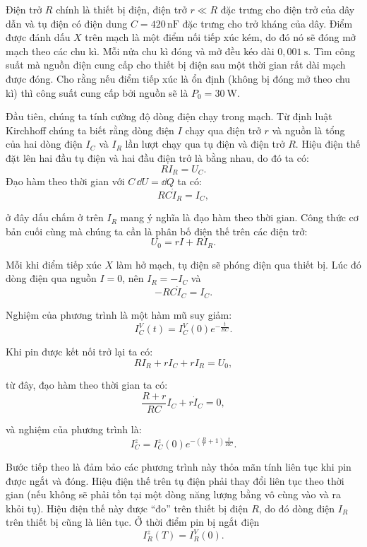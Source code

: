 \begin{vd}
\begin{center}
\begin{tikzpicture}[x=0.75pt,y=0.75pt,yscale=-1,xscale=1]
\end{tikzpicture}
\end{center}
Điện trở $R$ chính là thiết bị điện, điện trở $r \ll R$ đặc trưng cho điện trở của dây dẫn và tụ điện có điện dung $C=420\,\mathrm{nF}$ đặc trưng cho trở kháng của dây. Điểm được đánh dấu $X$ trên mạch là một điểm nối tiếp xúc kém, do đó nó sẽ đóng mở mạch theo các chu kì. Mỗi nửa chu kì đóng và mở đều kéo dài $0,001~\mathrm{s}$. Tìm công suất mà nguồn điện cung cấp cho thiết bị điện sau một thời gian rất dài mạch được đóng. Cho rằng nếu điểm tiếp xúc là ổn định (không bị đóng mở theo chu kì) thì công suất cung cấp bởi nguồn sẽ là $P_0 = 30~\mathrm{W}$.
\end{vd}
\begin{loigiai}\[\]
Đầu tiên, chúng ta tính cường độ dòng điện chạy trong mạch. Từ định luật Kirchhoff chúng ta biết rằng dòng điện $I$ chạy qua điện trở $r$ và nguồn là tổng của hai dòng điện $I_C$ và $I_R$ lần lượt chạy qua tụ điện và điện trở $R$. Hiệu điện thế đặt lên hai đầu tụ điện và hai đầu điện trở là bằng nhau, do đó ta có:
   \[R I_R = U_C .\]
Đạo hàm theo thời gian với $C\,\dd U= \dd Q$ ta có:
   \[RC \dot{I}_R = I_C , \]

ở đây dấu chấm ở trên $I_R$ mang ý nghĩa là đạo hàm theo thời gian. Công thức cơ bản cuối cùng mà chúng ta cần là phân bố điện thế trên các điện trở:
    \[U_0 = rI + RI_R .\]

Mỗi khi điểm tiếp xúc $X$ làm hở mạch, tụ điện sẽ phóng điện qua thiết bị. Lúc đó dòng điện qua nguồn $I=0$, nên $I_R=-I_C$ và
    \[-RC \dot{I}_C = I_C .\]

Nghiệm của phương trình là một hàm mũ suy giảm:
    \[ I_{C}^{V}(t) = I_{C}^{V}(0)  e^{-\frac{t}{RC}}.\]

Khi pin được kết nối trở lại ta có:
   \[ R I_R + rI_C + rI_R = U_0,\]

từ đây, đạo hàm theo thời gian ta có:
    \[ \frac{R+r}{RC} I_C + r \dot{I}_C =0,\]

và nghiệm của phương trình là:
  \[I_{C}^{z} = I_{C}^{z} (0) e^{-(\frac{R}{r} +1)\frac{t}{RC}}. \]

Bước tiếp theo là đảm bảo các phương trình này thỏa mãn tính liên tục khi pin được ngắt và đóng. Hiệu điện thế trên tụ điện phải thay đổi liên tục theo thời gian (nếu không sẽ phải tồn tại một dòng năng lượng bằng vô cùng vào và ra khỏi tụ). Hiệu điện thế này được “đo” trên thiết bị điện $R$, do đó dòng điện $I_R$ trên thiết bị cũng là liên tục. Ở thời điểm pin bị ngắt điện
    \[ I_{R}^{z}(T) = I_{R}^{V} (0) . \]


\end{loigiai}
